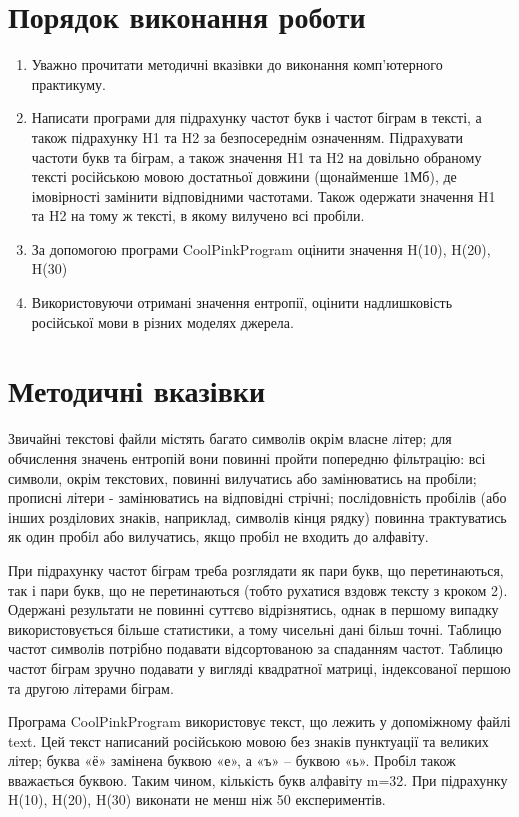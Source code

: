 \documentclass{article}
\begin{document}
	
	\newpage
	\large
	\section{Порядок виконання роботи}
	\begin{enumerate}
		\item Уважно прочитати методичні вказівки до виконання комп’ютерного практикуму.
		\item Написати програми для підрахунку частот букв і частот біграм в тексті, а також підрахунку H1 та H2 за безпосереднім означенням. Підрахувати частоти букв та біграм, а також значення H1 та H2 на довільно обраному тексті російською мовою достатньої довжини (щонайменше 1Мб), де імовірності замінити відповідними частотами. Також одержати значення H1 та H2 на тому ж тексті, в якому вилучено всі пробіли.
		\item За допомогою програми CoolPinkProgram оцінити значення H(10), H(20), H(30) 
		\item Використовуючи отримані значення ентропії, оцінити надлишковість російської
		мови в різних моделях джерела.
	\end{enumerate}
	
	\section{Методичні вказівки}
	Звичайні текстові файли містять багато символів окрім власне літер; для обчислення значень ентропій вони повинні пройти попередню фільтрацію: всі символи, окрім текстових, повинні вилучатись або замінюватись на пробіли; прописні літери - замінюватись на відповідні стрічні; послідовність пробілів (або інших розділових знаків, наприклад, символів кінця рядку) повинна трактуватись як один пробіл або вилучатись, якщо пробіл не входить до алфавіту.
	
	
	При підрахунку частот біграм треба розглядати як пари букв, що перетинаються, так і пари букв, що не перетинаються (тобто рухатися вздовж тексту з кроком 2). Одержані результати не повинні суттєво відрізнятись, однак в першому випадку використовується більше статистики, а тому чисельні дані більш точні. Таблицю частот символів потрібно подавати відсортованою за спаданням частот. Таблицю частот біграм зручно подавати у вигляді квадратної матриці, індексованої першою та другою літерами біграм.
	
	
	Програма CoolPinkProgram використовує текст, що лежить у допоміжному файлі text. Цей текст написаний російською мовою без знаків пунктуації та великих літер; буква «ё» замінена буквою «е», а «ъ» – буквою «ь». Пробіл також вважається буквою. Таким чином, кількість букв алфавіту m=32. При підрахунку H(10), H(20), H(30) виконати не менш ніж 50 експериментів.
	
\end{document}

